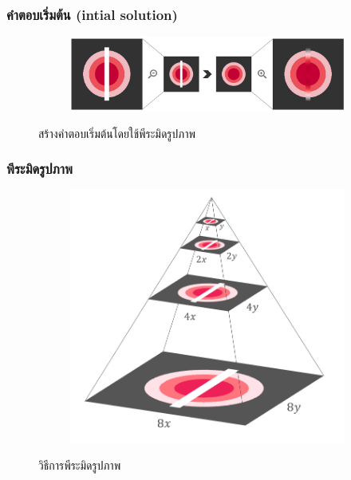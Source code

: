 \documentclass[xcolor=dvipsnames, xetex,serif]{beamer}
\numberwithin{equation}{section}
\begin{document}
    \begin{frame}
        \frametitle{คำตอบเริ่มต้น (intial solution)}
        \begin{figure}[H]
            \centering
            \begin{subfigure}{0.8\linewidth}
                \centering
                \includegraphics[width=1\linewidth]{images/image_inpaint_synthetic/image_inital_solution.png}
            \end{subfigure}
            \caption{สร้างคำตอบเริ่มต้นโดยใช้พีระมิดรูปภาพ}
        \end{figure}
    \end{frame}
    \begin{frame}
        \frametitle{พีระมิดรูปภาพ}
        \begin{figure}[H]
            \centering
            \begin{subfigure}{0.6\linewidth}
                \centering
                \includegraphics[width=0.8\linewidth]{images/image_inpaint_synthetic/image_pyramid.png}
            \end{subfigure}
            \caption{วิธีการพีระมิดรูปภาพ}
        \end{figure}
        \let\thefootnote\relax{}
    \end{frame}
\end{document}
